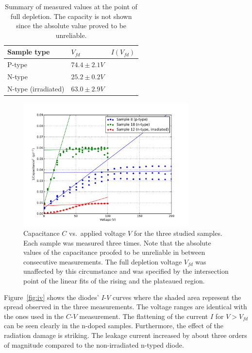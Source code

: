 \documentclass[11pt,a4paper]{report}
\begin{document}
\begin{table}
  \caption{Summary of measured values at the point of full depletion. The capacity is not shown since the absolute value proved to be unreliable.}\label{tab:results}
  \centering
  \begin{tabular}{lll}
    \toprule
    Sample type         & $V_{fd}$                 & $I(V_{fd})$ \\
    \midrule
    P-type              & $74.4 \pm 2.1 \si{V}$   &           \\
    N-type              & $25.2 \pm 0.2 \si{V}$  &             \\
    N-type (irradiated) & $63.0 \pm 2.9 \si{V}$ &             \\
    \bottomrule
  \end{tabular}
\end{table}



\label{sec:results}
\begin{figure}
  \centering
  \includegraphics[width=0.8\textwidth]{./figures/cv.pdf}  
  \caption{Capacitance $C$ vs.\ applied voltage $V$ for the three studied samples. Each sample was measured three times. Note that the absolute values of the capacitance proofed to be unreliable in between consecutive measurements. The full depletion voltage $V_{fd}$ was unaffected by this circumstance and was specified by the intersection point of the linear fits of the rising and the plateaued region.}\label{fig:cv}
\end{figure}

Figure~\ref{fig:iv} shows the diodes' $I$-$V$ curves where the shaded area represent the spread observed in the three measurements.
The voltage ranges are identical with the ones used in the $C$-$V$ measurement.
The flattening of the current $I$ for $V>V_{fd}$ can be seen clearly in the n-doped samples.
Furthermore, the effect of the radiation damage is striking.
The leakage current increased by about three orders of magnitude compared to the non-irradiated n-typed diode.
\end{document}
